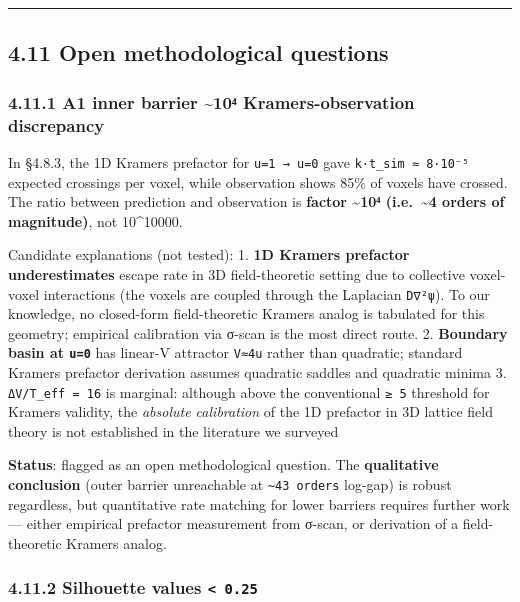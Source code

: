 \documentclass[
]{article}
\begin{document}
\begin{center}\rule{0.5\linewidth}{0.5pt}\end{center}

\hypertarget{open-methodological-questions}{%
\subsection{4.11 Open methodological
questions}\label{open-methodological-questions}}

\hypertarget{a1-inner-barrier-10ux2074-kramers-observation-discrepancy}{%
\subsubsection{4.11.1 A1 inner barrier \textasciitilde10⁴
Kramers-observation
discrepancy}\label{a1-inner-barrier-10ux2074-kramers-observation-discrepancy}}

In §4.8.3, the 1D Kramers prefactor for \texttt{u=1\ →\ u=0} gave
\texttt{k·t\_sim\ ≈\ 8·10⁻⁵} expected crossings per voxel, while
observation shows 85\% of voxels have crossed. The ratio between
prediction and observation is \textbf{factor \textasciitilde10⁴
(i.e.~\textasciitilde4 orders of magnitude)}, not 10\^{}10000.

Candidate explanations (not tested): 1. \textbf{1D Kramers prefactor
underestimates} escape rate in 3D field-theoretic setting due to
collective voxel-voxel interactions (the voxels are coupled through the
Laplacian \texttt{D∇²ψ}). To our knowledge, no closed-form
field-theoretic Kramers analog is tabulated for this geometry; empirical
calibration via σ-scan is the most direct route. 2. \textbf{Boundary
basin at \texttt{u=0}} has linear-V attractor \texttt{V≈4u} rather than
quadratic; standard Kramers prefactor derivation assumes quadratic
saddles and quadratic minima 3. \texttt{ΔV/T\_eff\ =\ 16} is marginal:
although above the conventional \texttt{≥\ 5} threshold for Kramers
validity, the \emph{absolute calibration} of the 1D prefactor in 3D
lattice field theory is not established in the literature we surveyed

\textbf{Status}: flagged as an open methodological question. The
\textbf{qualitative conclusion} (outer barrier unreachable at
\texttt{\textasciitilde{}43\ orders} log-gap) is robust regardless, but
quantitative rate matching for lower barriers requires further work ---
either empirical prefactor measurement from σ-scan, or derivation of a
field-theoretic Kramers analog.

\hypertarget{silhouette-values-0.25}{%
\subsubsection{\texorpdfstring{4.11.2 Silhouette values
\texttt{\textless{}\ 0.25}}{4.11.2 Silhouette values \textless{} 0.25}}\label{silhouette-values-0.25}}
\end{document}
